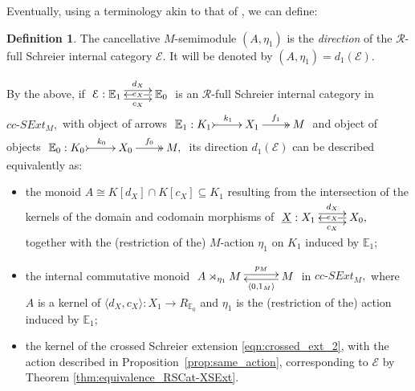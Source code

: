 \documentclass[a4paper]{amsart}
\theoremstyle{plain}
\theoremstyle{definition}
\newtheorem{definition}[subsection]{Definition}
\theoremstyle{remark}
\newcommand{\la}{\langle}
\newcommand{\ra}{\rangle}
\begin{document}
Eventually, using a terminology akin to that of \cite{aspherical, Bourn-Rodelo}, we can define:
\begin{definition}
\label{def:1-direction}
The cancellative $M$-semimodule $(A,\eta_1)$ is the \emph{direction} of the $\mathcal{R}$-full Schreier internal category $\mathcal{E}.$ It will be denoted by $(A,\eta_1)=d_1(\mathcal{E}).$
\end{definition}
By the above, if $\xymatrix{{\mathcal{E}:{{\mathbb{E}}_1}} \ar@<.9ex>[r]^-{d_X} \ar@<-.9ex>[r]_-{c_X} &{{\mathbb{E}}_0} \ar[l]|-{e_X}
}$ is an $\mathcal{R}$-full Schreier internal category in $cc\text{-}SExt_M,$ with object of arrows $\xymatrix{{\mathbb{E}_1:K_1} \ar@{>->}[r]^-{k_1} &{X_1} \ar@{->>}[r]^-{f_1} &{M}}$ and object of objects $\xymatrix{{\mathbb{E}_0:K_0} \ar@{>->}[r]^-{k_0} &{X_0} \ar@{->>}[r]^-{f_0} &{M,}}$ its direction $d_1(\mathcal{E})$ can be described equivalently as:
\begin{itemize}
\item the monoid $A\cong K[d_X]\cap K[c_X]\subseteq K_1$ resulting from the intersection of the kernels of the domain and codomain morphisms of $\xymatrix{{\underline{X}: X_1} \ar@<.9ex>[r]^-{d_X} \ar@<-.9ex>[r]_-{c_X} &{X_0,} \ar[l]|-{e_X}}$ together with the (restriction of the) $M$-action $\eta_1$ on $K_1$ induced by ${\mathbb{E}}_1;$
\item the internal commutative monoid $\xymatrixcolsep{2.5pc}\xymatrix{{A\rtimes_{\eta_1} M} \ar@<.5ex>[r]^-{p_M} &{M} \ar@<.5ex>[l]^-{\la 0,1_M\ra}}$ in $cc\text{-}SExt_M,$ where $A$ is a kernel of $\la d_X,c_X\ra\colon X_1\longrightarrow R_{{\mathbb{E}}_0}$ and $\eta_1$ is the (restriction of the) action induced by ${\mathbb{E}}_1;$
\item the kernel of the crossed Schreier extension \eqref{eqn:crossed_ext_2}, with the action described in Proposition~\ref{prop:same_action}, corresponding to $\mathcal{E}$ by Theorem \ref{thm:equivalence_RSCat-XSExt}.
\end{itemize}
\end{document}
